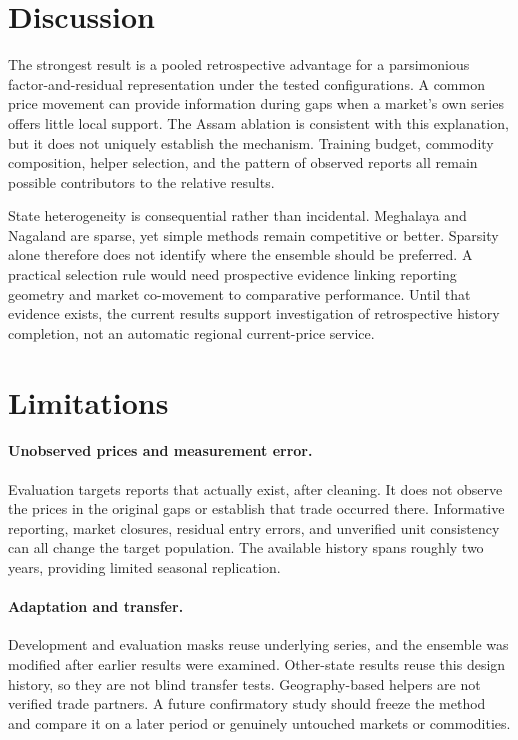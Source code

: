 \documentclass[sigconf,nonacm,balance=false]{acmart}
\begin{document}
\section{Discussion}\label{sec:discussion}

The strongest result is a pooled retrospective advantage for a parsimonious factor-and-residual representation under the tested configurations. A common price movement can provide information during gaps when a market's own series offers little local support. The Assam ablation is consistent with this explanation, but it does not uniquely establish the mechanism. Training budget, commodity composition, helper selection, and the pattern of observed reports all remain possible contributors to the relative results.

State heterogeneity is consequential rather than incidental. Meghalaya and Nagaland are sparse, yet simple methods remain competitive or better. Sparsity alone therefore does not identify where the ensemble should be preferred. A practical selection rule would need prospective evidence linking reporting geometry and market co-movement to comparative performance. Until that evidence exists, the current results support investigation of retrospective history completion, not an automatic regional current-price service.

\section{Limitations}\label{sec:limits}

\paragraph{Unobserved prices and measurement error.}
Evaluation targets reports that actually exist, after cleaning. It does not observe the prices in the original gaps or establish that trade occurred there. Informative reporting, market closures, residual entry errors, and unverified unit consistency can all change the target population. The available history spans roughly two years, providing limited seasonal replication.

\paragraph{Adaptation and transfer.}
Development and evaluation masks reuse underlying series, and the ensemble was modified after earlier results were examined. Other-state results reuse this design history, so they are not blind transfer tests. Geography-based helpers are not verified trade partners. A future confirmatory study should freeze the method and compare it on a later period or genuinely untouched markets or commodities.
\end{document}
